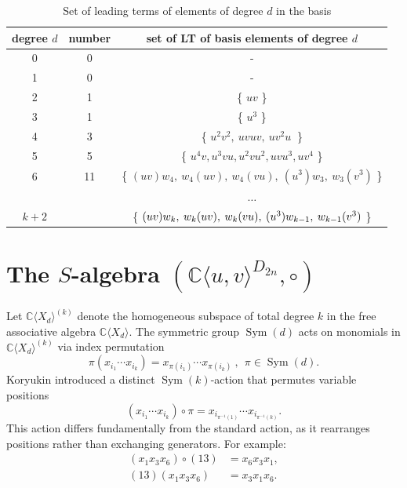 \documentclass{amsart}[12pt]
\theoremstyle{definition}
\DeclareMathOperator{\Sym}{Sym}
\newcommand{\CuvD}{{\mathbb C}\langle u,v\rangle^{D_{2n}}}
\begin{document}
\begin{table}[h!]
	\centering
	\begin{tabular}{|c|c|c|}
		\hline
		degree $d$ & number & set of LT of basis elements of degree $d$   \\
		\hline \hline
		0 & 0 & -\\ [0.2cm]
		\hline
		1 & 0 & -\\ [0.2cm]
		\hline
		2 & 1  & \{ $uv$ \} \\ [0.2cm]
		\hline
		3 &  1 & \{ $u^3$ \} \\ [0.2cm]
		\hline
		4 & 3 & \{ $u^2v^2, \ uvuv, \ uv^2u\ $ \} \\ [0.2cm]
		\hline
		5 & 5  &\{ $    u^4v, u^3vu, u^2vu^2, uvu^3, uv^4 $ \}\\ [0.2cm]
		\hline
		6 & 11  &\{ $ (uv)w_4, \ w_4(uv), \ w_4(vu), \  (u^3 )w_3, \ w_3(v^3) $ \}\\ [0.2cm]
		\hline
		& & $\dots$ \\ [0.2cm]
		\hline
		$k+2 $ &    & \{ $ {\tiny   (uv)w_{k }, \ w_{k }(uv), \ w_{k}(vu), \ (u^3 )w_{k-1}, \ w_{k-1}(v^3) } $ \}\\ [0.2cm]
		\hline
	\end{tabular}
	\caption{Set of leading terms of elements of degree $d$ in the basis}
\end{table}

\section{\textbf{The $S$-algebra} $(\CuvD,\circ)$}

Let ${\mathbb C}\langle X_d\rangle^{(k)}$ denote the homogeneous subspace of total degree $k$ in the free associative algebra ${\mathbb C}\langle X_d\rangle$.
The symmetric group $\Sym(d)$ acts on monomials in ${\mathbb C}\langle X_d\rangle^{(k)}$ via index permutation
\[
\pi(x_{i_1}\cdots x_{i_k})=x_{\pi(i_1)}\cdots x_{\pi(i_k)} \ , \ \ \pi\in \Sym(d).
\]
Koryukin \cite{Kor} introduced a distinct $\Sym(k)$-action that permutes variable positions
\[
(x_{i_1}\cdots x_{i_k})\circ \pi=x_{i_{\pi^{-1}(1)}}\cdots x_{i_{\pi^{-1}(k)}}.
\]
This action differs fundamentally from the standard action, as it rearranges positions rather than exchanging generators. For example:
\begin{align*}
	(x_1x_3x_6)\circ (13)&=x_6x_3x_1,\\
	(13)(x_1x_3x_6)&=x_3x_1x_6.
\end{align*}
\end{document}
